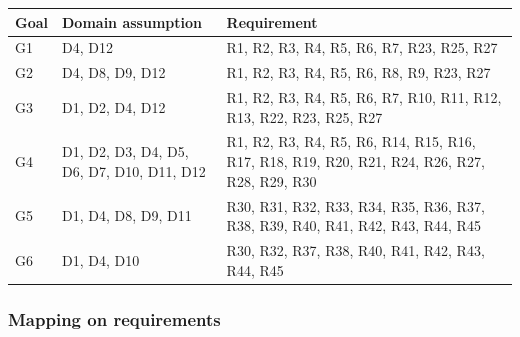 \documentclass[11pt]{article}
\begin{document}
\begin{table}[H]
    \centering
    \setlength{\tabcolsep}{18pt}
    \renewcommand{\arraystretch}{1.2}
    \begin{tabularx}{\textwidth}{|>{\hsize=0.4\hsize}X|>{\hsize=1\hsize}X|>{\hsize=1.6\hsize}X|}
        \hline
        \textbf{Goal} & \textbf{Domain assumption} & \textbf{Requirement} \\
        \hline
        G1 & D4, D12 & R1, R2, R3, R4, R5, R6, R7, R23, R25, R27 \\ %
        \hline
        G2 & D4, D8, D9, D12 & R1, R2, R3, R4, R5, R6, R8, R9, R23, R27 \\ %
        \hline
        G3 & D1, D2, D4, D12 & R1, R2, R3, R4, R5, R6, R7, R10, R11, R12, R13, R22, R23, R25, R27 \\ %
        \hline
        G4 & D1, D2, D3, D4, D5, D6, D7, D10, D11, D12 & R1, R2, R3, R4, R5, R6, R14, R15, R16, R17, R18, R19, R20, R21, R24, R26, R27, R28, R29, R30 \\ %
        \hline
        G5 & D1, D4, D8, D9, D11 & R30, R31, R32, R33, R34, R35, R36, R37, R38, R39, R40, R41, R42, R43, R44, R45 \\ %
        \hline
        G6 & D1, D4, D10 & R30, R32, R37, R38, R40, R41, R42, R43, R44, R45 \\ %
        \hline
    \end{tabularx}
    \label{tab:requirementsMapping}
\end{table}

\subsubsection{Mapping on requirements}
\end{document}
